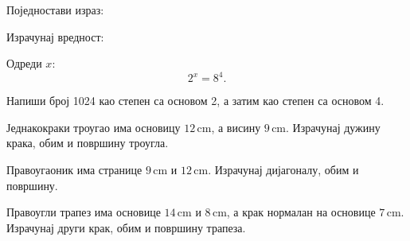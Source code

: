 \documentclass[11pt,a5paper,twoside,addpoints,noanswers]{exam} %
\newcommand{\measure}[2]{#1\,\mathrm{#2}}
\newcommand{\variant}[4]{#1}
\begin{document}
\begin{questions}
\question %
Поједностави израз:
\begin{multicols}{2}
\end{multicols}

\question %
Израчунај вредност:
\begin{multicols}{2}
\end{multicols}

\question[3] %
Одреди $x$:
\[
\variant{2^x=8^4}{(3^{2x})^2=3^{20}}{5^{x+1}=125}{7^{3x}=7^{12}}.
\]

\question[4] %
Напиши број \variant{1024}{3125}{81}{64}
као степен са основом \variant{2}{5}{3}{2},
а затим као степен са основом \variant{4}{25}{9}{8}.


\question[4] %
Једнакокраки троугао има основицу $\measure{\variant{12}{14}{10}{8}}{cm}$, а висину $\measure{\variant{9}{10}{8}{6}}{cm}$. Израчунај дужину крака, обим и површину троугла.

\question[4] %
Правоугаоник има странице $\measure{\variant{9}{12}{7}{15}}{cm}$ и $\measure{\variant{12}{5}{24}{8}}{cm}$. Израчунај дијагоналу, обим и површину.

\question %

\question[5] %
Правоугли трапез има основице $\measure{\variant{14}{16}{12}{10}}{cm}$ и $\measure{\variant{8}{10}{6}{5}}{cm}$, а крак нормалан на основице $\measure{\variant{7}{6}{5}{8}}{cm}$. Израчунај други крак, обим и површину трапеза.

\end{questions}
\end{document}
